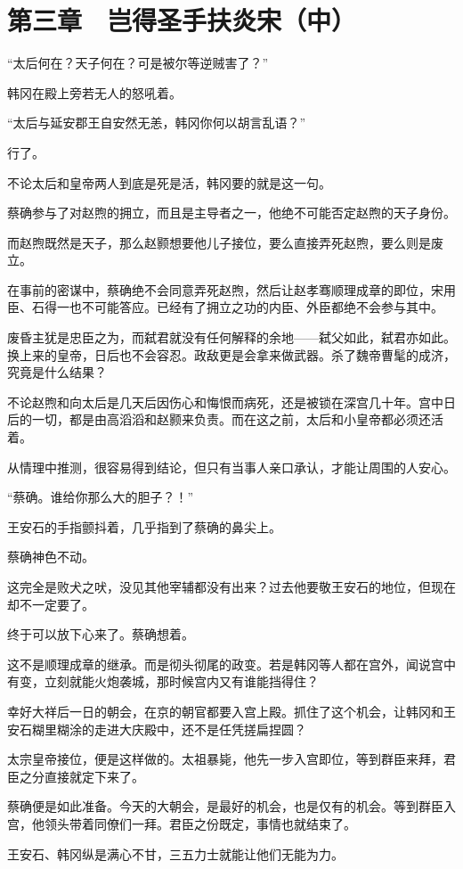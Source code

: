 \section{第三章　岂得圣手扶炎宋（中）}

“太后何在？天子何在？可是被尔等逆贼害了？”

韩冈在殿上旁若无人的怒吼着。

“太后与延安郡王自安然无恙，韩冈你何以胡言乱语？”

行了。

不论太后和皇帝两人到底是死是活，韩冈要的就是这一句。

蔡确参与了对赵煦的拥立，而且是主导者之一，他绝不可能否定赵煦的天子身份。

而赵煦既然是天子，那么赵颢想要他儿子接位，要么直接弄死赵煦，要么则是废立。

在事前的密谋中，蔡确绝不会同意弄死赵煦，然后让赵孝骞顺理成章的即位，宋用臣、石得一也不可能答应。已经有了拥立之功的内臣、外臣都绝不会参与其中。

废昏主犹是忠臣之为，而弑君就没有任何解释的余地——弑父如此，弑君亦如此。换上来的皇帝，日后也不会容忍。政敌更是会拿来做武器。杀了魏帝曹髦的成济，究竟是什么结果？

不论赵煦和向太后是几天后因伤心和悔恨而病死，还是被锁在深宫几十年。宫中日后的一切，都是由高滔滔和赵颢来负责。而在这之前，太后和小皇帝都必须还活着。

从情理中推测，很容易得到结论，但只有当事人亲口承认，才能让周围的人安心。

“蔡确。谁给你那么大的胆子？！”

王安石的手指颤抖着，几乎指到了蔡确的鼻尖上。

蔡确神色不动。

这完全是败犬之吠，没见其他宰辅都没有出来？过去他要敬王安石的地位，但现在却不一定要了。

终于可以放下心来了。蔡确想着。

这不是顺理成章的继承。而是彻头彻尾的政变。若是韩冈等人都在宫外，闻说宫中有变，立刻就能火炮袭城，那时候宫内又有谁能挡得住？

幸好大祥后一日的朝会，在京的朝官都要入宫上殿。抓住了这个机会，让韩冈和王安石糊里糊涂的走进大庆殿中，还不是任凭搓扁捏圆？

太宗皇帝接位，便是这样做的。太祖暴毙，他先一步入宫即位，等到群臣来拜，君臣之分直接就定下来了。

蔡确便是如此准备。今天的大朝会，是最好的机会，也是仅有的机会。等到群臣入宫，他领头带着同僚们一拜。君臣之份既定，事情也就结束了。

王安石、韩冈纵是满心不甘，三五力士就能让他们无能为力。

